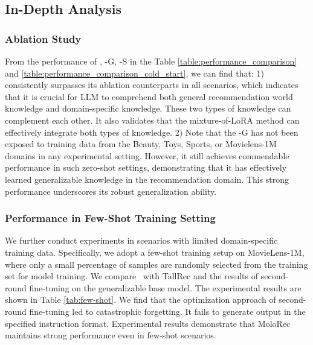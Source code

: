 \subsection{In-Depth Analysis}
\subsubsection{\textbf{Ablation Study}}
From the performance of \shortname, \shortname-G, \shortname-S in the Table \ref{table:performance_comparison} and \ref{table:performance_comparison_cold_start}, we can find that:
1) \shortname~ consistently surpasses its ablation counterparts in all scenarios, which indicates that it is crucial for LLM to comprehend both general recommendation world knowledge and domain-specific knowledge. These two types of knowledge can complement each other. It also validates that the mixture-of-LoRA method can effectively integrate both types of knowledge. 2) Note that the \shortname-G has not been exposed to training data from the Beauty, Toys, Sports, or Movielens-1M domains in any experimental setting. However, it still achieves commendable performance in such zero-shot settings, demonstrating that it has effectively learned generalizable knowledge in the recommendation domain. This strong performance underscores its robust generalization ability.

\subsubsection{\textbf{Performance in Few-Shot Training Setting}}
We further conduct experiments in scenarios with limited domain-specific training data. Specifically, we adopt a few-shot training setup on MovieLens-1M, where only a small percentage of samples are randomly selected from the training set for model training. We compare \shortname~with TallRec and the results of second-round fine-tuning on the generalizable base model. The experimental results are shown in Table \ref{tab:few-shot}.
We find that the optimization approach of second-round fine-tuning led to catastrophic forgetting. It fails to generate output in the specified instruction format. Experimental results demonstrate that MoloRec maintains strong performance even in few-shot scenarios.

